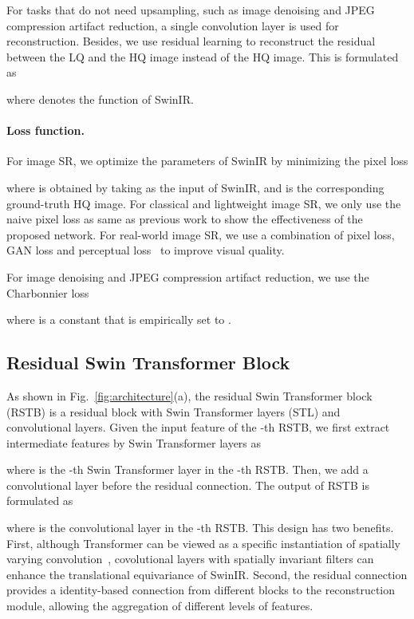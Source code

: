 \documentclass[10pt,twocolumn,letterpaper]{article}
\newcommand{\R}[1]{\textcolor[rgb]{1.00,0.00,0.00}{#1}}
\newlength \g
\begin{document}
For tasks that do not need upsampling, such as image denoising and JPEG compression artifact reduction, a single convolution layer is used for reconstruction. Besides, we use residual learning to reconstruct the residual between the LQ and the HQ image instead of the HQ image. This is formulated as

where  denotes the function of SwinIR.



\vspace{-0.4cm}
\paragraph{Loss function.}
For image SR, we optimize the parameters of SwinIR by minimizing the  pixel loss

where  is obtained by taking  as the input of SwinIR, and  is the corresponding ground-truth HQ image. For classical and lightweight image SR, we only use the naive  pixel loss as same as previous work to show the effectiveness of the proposed network. For real-world image SR, we use a combination of pixel loss, GAN loss and perceptual loss~\cite{wang2018esrgan, kai2021bsrgan, wang2021realESRGAN, goodfellow2014GAN, johnson2016perceptual, wang2018esrgan} to improve visual quality.

For image denoising and JPEG compression artifact reduction, we use the Charbonnier loss~\cite{charbonnier1994Charbonnier}

where  is a constant that is empirically set to .



\subsection{Residual Swin Transformer Block}
As shown in Fig.~\ref{fig:architecture}\R{(a)}, the residual Swin Transformer block (RSTB) is a residual block with Swin Transformer layers (STL) and convolutional layers. Given the input feature  of the -th RSTB, we first extract intermediate features  by  Swin Transformer layers as
 
where  is the -th Swin Transformer layer in the -th RSTB. Then, we add a convolutional layer before the residual connection. The output of RSTB is formulated as

where  is the convolutional layer in the -th RSTB. This design has two benefits. First, although Transformer can be viewed as a specific instantiation of spatially varying convolution~\cite{elsayed2020revisiting, vaswani2021SAhaloing}, covolutional layers with spatially invariant filters can enhance the translational equivariance of SwinIR. Second, the residual connection provides a identity-based connection from different blocks to the reconstruction module, allowing the aggregation of different levels of features.
\end{document}
